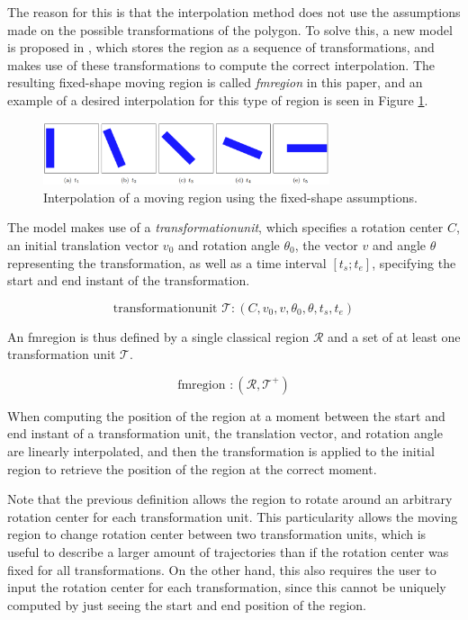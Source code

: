 The reason for this is that the interpolation method does not use the assumptions made on the possible transformations of the polygon. To solve this, a new model is proposed in \cite{fmregion}, which stores the region as a sequence of transformations, and makes use of these transformations to compute the correct interpolation. The resulting fixed-shape moving region is called \textit{fmregion} in this paper, and an example of a desired interpolation for this type of region is seen in Figure \ref{fig:fixed_shape_interpolation}.

\begin{figure}[h!]
    \centering
    \includegraphics[width=0.75\textwidth]{images/fixed_shape_interpolation.png}
    \caption[Linear interpolation of a fixed-shape moving region]{Interpolation of a moving region using the fixed-shape assumptions. \cite{fmregion}}
    \label{fig:fixed_shape_interpolation}
\end{figure}


The model makes use of a \textit{transformationunit}, which specifies a rotation center $C$, an initial translation vector $v_0$ and rotation angle $\theta_0$, the vector $v$ and angle $\theta$ representing the transformation, as well as a time interval $[t_s; t_e]$, specifying the start and end instant of the transformation.

\[
    \text{transformationunit } \mathcal{T}: (C, v_0, v, \theta_0, \theta, t_{s}, t_{e})
\]

An fmregion is thus defined by a single classical region $\mathcal{R}$ and a set of at least one transformation unit $\mathcal{T}$.

\[
    \text{fmregion } : (\mathcal{R}, \mathcal{T}^{+})
\]

When computing the position of the region at a moment between the start and end instant of a transformation unit, the translation vector, and rotation angle are linearly interpolated, and then the transformation is applied to the initial region to retrieve the position of the region at the correct moment.

Note that the previous definition allows the region to rotate around an arbitrary rotation center for each transformation unit. This particularity allows the moving region to change rotation center between two transformation units, which is useful to describe a larger amount of trajectories than if the rotation center was fixed for all transformations. On the other hand, this also requires the user to input the rotation center for each transformation, since this cannot be uniquely computed by just seeing the start and end position of the region.

